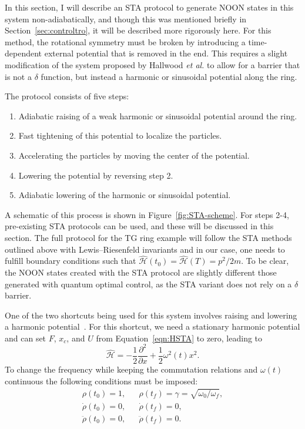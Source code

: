 In this section, I will describe an STA protocol to generate NOON states in this system non-adiabatically, and though this was mentioned briefly in Section~\ref{sec:controltro}, it will be described more rigorously here.
For this method, the rotational symmetry must be broken by introducing a time-dependent external potential that is removed in the end.
This requires a slight modification of the system proposed by Hallwood \textit{et al.} to allow for a barrier that is not a $\delta$ function, but instead a harmonic or sinusoidal potential along the ring.

The protocol consists of five steps:
\begin{enumerate}
\item Adiabatic raising of a weak harmonic or sinusoidal potential around the ring.
\item Fast tightening of this potential to localize the particles.
\item Accelerating the particles by moving the center of the potential.
\item Lowering the potential by reversing step 2.
\item Adiabatic lowering of the harmonic or sinusoidal potential.
\end{enumerate}
A schematic of this process is shown in Figure~\ref{fig:STA-scheme}.
For steps 2-4, pre-existing STA protocols can be used, and these will be discussed in this section.
The full protocol for the TG ring example will follow the STA methods outlined above with Lewis--Riesenfeld invariants and in our case, one needs to fulfill boundary conditions such that $\mathcal{\hat H}(t_0) = \mathcal{\hat H}(T)=p^2/2m$.
To be clear, the NOON states created with the STA protocol are slightly different those generated with quantum optimal control, as the STA variant does not rely on a $\delta$ barrier.

One of the two shortcuts being used for this system involves raising and lowering a harmonic potential~\cite{chen2010,chen20102}.
For this shortcut, we need a stationary harmonic potential and can set $F$, $x_c$, and $U$ from Equation~\eqref{eqn:HSTA} to zero, leading to
\begin{equation}
 \mathcal{\hat H}= -\frac{1}{2} \frac{\partial^2}{\partial x}+ \frac 1 2 \omega^2(t) x^2.
\end{equation}
\noindent To change the frequency while keeping the commutation relations and $\omega(t)$ continuous the following conditions must be imposed:
\begin{equation}
 \begin{array}{lcl}
\rho(t_0)=1, && \rho(t_f)=\gamma=\sqrt{\omega_0 / \omega_f},\\
\dot \rho(t_0)=0, && \dot \rho(t_f) =0, \\
\ddot \rho(t_0)=0, && \ddot \rho(t_f)=0.
\end{array} \label{eqn:squeeze}
\end{equation}

